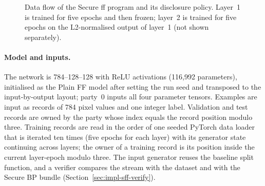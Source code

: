 \begin{figure}[ht]
\centering
{}
\caption{Data flow of the Secure \ac{ff} program and its disclosure policy. Layer~1 is trained for five epochs and then frozen; layer~2 is trained for five epochs on the L2-normalised output of layer~1 (not shown separately).}
\label{fig:impl-sff}
\end{figure}

\paragraph{Model and inputs.} The network is 784--128--128 with ReLU activations (116{,}992 parameters), initialised as the Plain FF model after setting the run seed and transposed to the input-by-output layout; party~0 inputs all four parameter tensors. Examples are input as records of 784 pixel values and one integer label. Validation and test records are owned by the party whose index equals the record position modulo three. Training records are read in the order of one seeded PyTorch data loader that is iterated ten times (five epochs for each layer) with its generator state continuing across layers; the owner of a training record is its position inside the current layer-epoch modulo three. The input generator reuses the baseline split function, and a verifier compares the stream with the dataset and with the Secure BP bundle (Section~\ref{sec:impl-sff-verify}).

